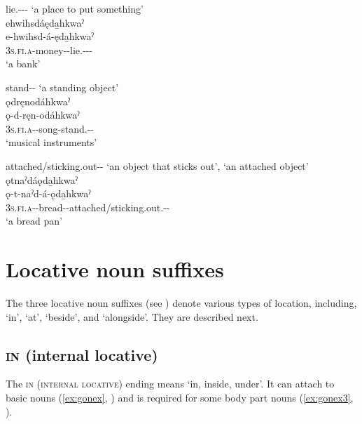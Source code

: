 \ea\label{ex:kwaex3}  lie.{\stative}-{\euphonicd}--{\instrumental} ‘a place to put something’\\
ehwihsdáęda̱hkwaˀ\\
\gll e-hwihsd-á-ęda̱hkwaˀ\\
 \textsc{3s.fi.a}-money-{\joinerA}-lie.{\stative}-{\euphonicd}--{\instrumental}\\
\glt `a bank'
\z


\ea\label{ex:kwaex4}  stand-{\joinerA}-{\instrumental} ‘a standing object’\\
ǫdręnodáhkwaˀ\\
\gll ǫ-d-ręn-odáhkwaˀ\\
 \textsc{3s.fi.a}-{\semireflexive}-song-stand.{\stative}-{\joinerA}-{\instrumental}\\
\glt `musical instruments'
\z


\ea\label{ex:kwaex5}  attached/sticking.out-{\joinerA}-{\instrumental} ‘an object that sticks out’, ‘an attached object’\\
ǫtnaˀdáǫda̱hkwaˀ\\
\gll ǫ-t-naˀd-á-ǫda̱hkwaˀ\\
 \textsc{3s.fi.a}-{\semireflexive}-bread-{\joinerA}-attached/sticking.out.{\stative}-{\joinerA}-{\instrumental}\\
\glt `a bread pan'
\z


\section{Locative noun suffixes} \label{Locative noun suffixes}
The three locative noun suffixes (see ) denote various types of location, including, ‘in’, ‘at’, ‘beside’, and ‘alongside’. They are described next.

\subsection{ \textsc{in} (internal locative)} \label{[-gǫ:]}
The  \textsc{in} (\textsc{internal locative}) ending means ‘in, inside, under’. It can attach to basic nouns (\ref{ex:gonex}, ) and is required for some body part nouns (\ref{ex:gonex3}, ).

